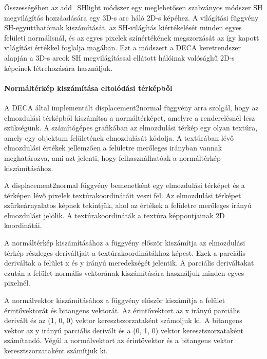 \documentclass[12pt,a4]{article}
\begin{document}
            Összességében az add\_SHlight módszer egy meglehetősen szabványos módszer SH megvilágítás hozzáadására egy 3D-s arc háló 2D-s képéhez. A világítási függvény SH-együtthatóinak kiszámítását, 
            az SH-világítás kiértékelését minden egyes felületi normálisnál, és az egyes pixelek színértékének megszorzását az így kapott világítási értékkel foglalja magában. 
            Ezt a módszert a DECA keretrendszer alapján a 3D-s arcok SH megvilágítással ellátott hálóinak valósághű 2D-s képeinek létrehozására használjuk.

        \paragraph{Normáltérkép kiszámítása eltolódási térképből}

            A DECA \cite{deca} által implementált displacement2normal függvény arra szolgál, hogy az elmozdulási térképből kiszámítsa a normáltérképet, amelyre a renderelésnél lesz szükségünk. 
            A számítógépes grafikában az elmozdulási térkép egy olyan textúra, amely egy objektum felületének elmozdulását kódolja.
            A textúrában lévő elmozdulási értékek jellemzően a felületre merőleges irányban vannak meghatározva, ami azt jelenti, hogy felhasználhatóak a normáltérkép kiszámításához.
            
            A displacement2normal függvény bemenetként egy elmozdulási térképet és a térképen lévő pixelek textúrakoordinátáit veszi fel. 
            Az elmozdulási térképet szürkeárnyalatos képnek tekintjük, ahol az értékek a felületre merőleges irányú elmozdulást jelölik.
            A textúrakoordináták a textúra képpontjainak 2D koordinátái.
            
            A normáltérkép kiszámításához a függvény először kiszámítja az elmozdulási térkép részleges deriváltjait a textúrakoordinátákhoz képest.
            Ezek a parciális deriváltak a felület x és y irányú meredekségét jelentik. A parciális deriváltakat ezután a felület normális vektorának kiszámítására használjuk minden egyes pixelnél.
            
            A normálvektor kiszámításához a függvény először kiszámítja a felület érintővektorát és bitangens vektorát.
            Az érintővektort az x irányú parciális derivált és az (1, 0, 0) vektor keresztszorzataként számoljuk ki. 
            A bitangens vektor az y irányú parciális derivált és a (0, 1, 0) vektor keresztszorzataként számítandó. 
            Végül a normálvektort az érintővektor és a bitangens vektor keresztszorzataként számítjuk ki.
            
\end{document}
